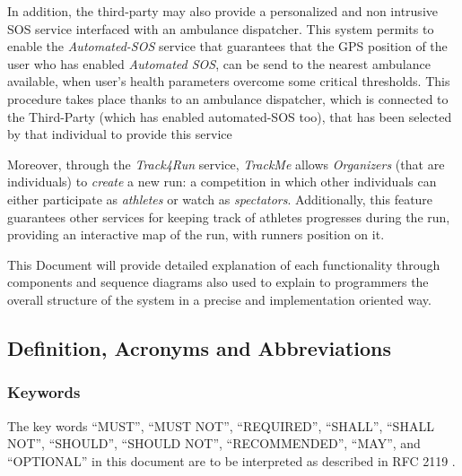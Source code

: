 \documentclass[a4paper]{article}
\begin{document}
   In addition, the third-party may also provide a personalized and non intrusive SOS service interfaced with an ambulance dispatcher.
   This system permits to enable the \textit{Automated-SOS} service that guarantees that the GPS position of the user who has enabled \textit{Automated SOS}, can be send to the nearest ambulance available, when user's health parameters overcome some critical thresholds. This procedure takes place thanks to an ambulance dispatcher, which is connected to the Third-Party (which has enabled automated-SOS too), that has been selected by that individual to provide this service
   
   Moreover, through  the \textit{Track4Run} service, \textit{TrackMe} allows \textit{Organizers} (that are individuals)  to  \textit{create}  a  new  run:  a  competition  in  which other individuals can either participate as \textit{athletes} or watch as \textit{spectators}.  Additionally, this feature guarantees other services for keeping track of athletes progresses during the run, providing an interactive map of the run, with runners position on it.

    This Document will provide detailed explanation of each functionality through components and sequence diagrams also used to explain to programmers the overall structure of the system in a precise and implementation oriented way.
    
\subsection{Definition, Acronyms and  Abbreviations}
            \subsubsection{Keywords}
            The key words “MUST”, “MUST NOT”, “REQUIRED”, “SHALL”, “SHALL NOT”, “SHOULD”, “SHOULD NOT”, “RECOMMENDED”, “MAY”, and “OPTIONAL” in this document are to be interpreted as described in RFC 2119 \cite{bradner1997key}.
            
\end{document}

